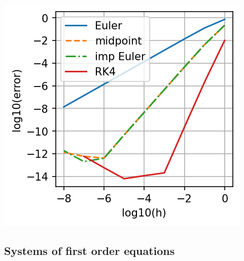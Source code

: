 \documentclass[12pt,letterpaper,noanswers]{exam}
\begin{document}
\includegraphics[]{img/C18error.png}
\subsection*{Systems of first order equations}
\end{document}
